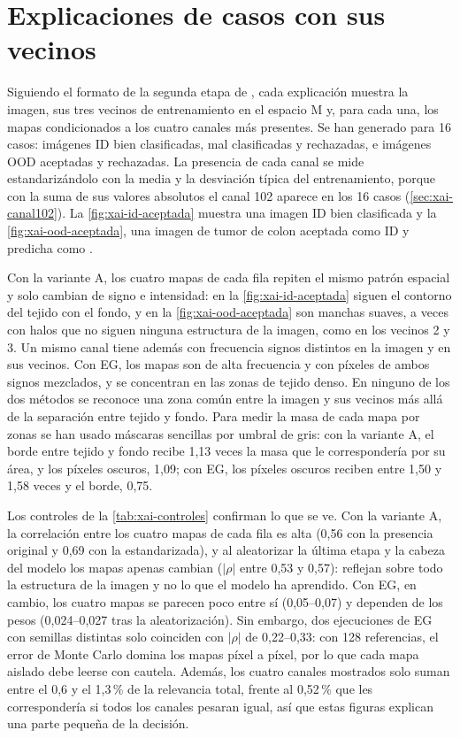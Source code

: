 \section{Explicaciones de casos con sus vecinos}\label{sec:xai-casos}

Siguiendo el formato de la segunda etapa de \stoodx, cada explicación muestra la imagen, sus tres vecinos de entrenamiento en el espacio M y, para cada una, los mapas condicionados a los cuatro canales más presentes. Se han generado para 16 casos: imágenes ID bien clasificadas, mal clasificadas y rechazadas, e imágenes OOD aceptadas y rechazadas. La presencia de cada canal se mide estandarizándolo con la media y la desviación típica del entrenamiento, porque con la suma de sus valores absolutos el canal 102 aparece en los 16 casos (\cref{sec:xai-canal102}). La \cref{fig:xai-id-aceptada} muestra una imagen ID bien clasificada y la \cref{fig:xai-ood-aceptada}, una imagen de tumor de colon aceptada como ID y predicha como .

Con la variante A, los cuatro mapas de cada fila repiten el mismo patrón espacial y solo cambian de signo e intensidad: en la \cref{fig:xai-id-aceptada} siguen el contorno del tejido con el fondo, y en la \cref{fig:xai-ood-aceptada} son manchas suaves, a veces con halos que no siguen ninguna estructura de la imagen, como en los vecinos 2 y 3. Un mismo canal tiene además con frecuencia signos distintos en la imagen y en sus vecinos. Con EG, los mapas son de alta frecuencia y con píxeles de ambos signos mezclados, y se concentran en las zonas de tejido denso. En ninguno de los dos métodos se reconoce una zona común entre la imagen y sus vecinos más allá de la separación entre tejido y fondo. Para medir la masa de cada mapa por zonas se han usado máscaras sencillas por umbral de gris: con la variante A, el borde entre tejido y fondo recibe 1,13 veces la masa que le correspondería por su área, y los píxeles oscuros, 1,09; con EG, los píxeles oscuros reciben entre 1,50 y 1,58 veces y el borde, 0,75.



Los controles de la \cref{tab:xai-controles} confirman lo que se ve. Con la variante A, la correlación entre los cuatro mapas de cada fila es alta (0,56 con la presencia original y 0,69 con la estandarizada), y al aleatorizar la última etapa y la cabeza del modelo los mapas apenas cambian ($|\rho|$ entre 0,53 y 0,57): reflejan sobre todo la estructura de la imagen y no lo que el modelo ha aprendido. Con EG, en cambio, los cuatro mapas se parecen poco entre sí (0,05--0,07) y dependen de los pesos (0,024--0,027 tras la aleatorización). Sin embargo, dos ejecuciones de EG con semillas distintas solo coinciden con $|\rho|$ de 0,22--0,33: con 128 referencias, el error de Monte Carlo domina los mapas píxel a píxel, por lo que cada mapa aislado debe leerse con cautela. Además, los cuatro canales mostrados solo suman entre el 0,6 y el 1,3\,\% de la relevancia total, frente al 0,52\,\% que les correspondería si todos los canales pesaran igual, así que estas figuras explican una parte pequeña de la decisión.

